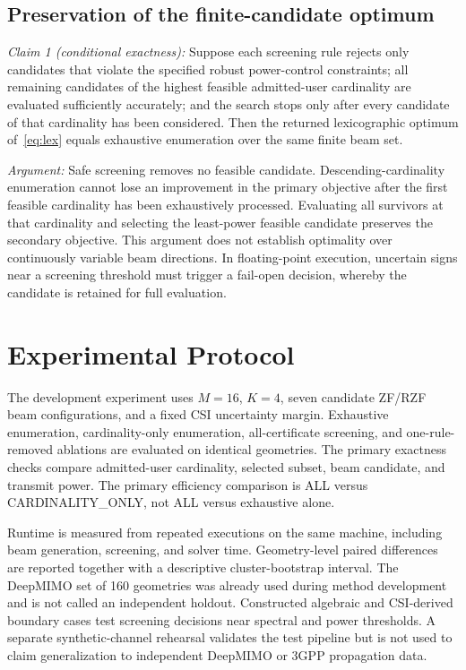\documentclass[journal]{IEEEtran}
\begin{document}
\subsection{Preservation of the finite-candidate optimum}
\emph{Claim 1 (conditional exactness):} Suppose each screening rule rejects only candidates that violate the specified robust power-control constraints; all remaining candidates of the highest feasible admitted-user cardinality are evaluated sufficiently accurately; and the search stops only after every candidate of that cardinality has been considered. Then the returned lexicographic optimum of~\eqref{eq:lex} equals exhaustive enumeration over the same finite beam set.

\emph{Argument:} Safe screening removes no feasible candidate. Descending-cardinality enumeration cannot lose an improvement in the primary objective after the first feasible cardinality has been exhaustively processed. Evaluating all survivors at that cardinality and selecting the least-power feasible candidate preserves the secondary objective. This argument does not establish optimality over continuously variable beam directions. In floating-point execution, uncertain signs near a screening threshold must trigger a fail-open decision, whereby the candidate is retained for full evaluation.

\section{Experimental Protocol}
The development experiment uses $M=16$, $K=4$, seven candidate ZF/RZF beam configurations, and a fixed CSI uncertainty margin. Exhaustive enumeration, cardinality-only enumeration, all-certificate screening, and one-rule-removed ablations are evaluated on identical geometries. The primary exactness checks compare admitted-user cardinality, selected subset, beam candidate, and transmit power. The primary efficiency comparison is ALL versus CARDINALITY\_ONLY, not ALL versus exhaustive alone.

Runtime is measured from repeated executions on the same machine, including beam generation, screening, and solver time. Geometry-level paired differences are reported together with a descriptive cluster-bootstrap interval. The DeepMIMO set of 160 geometries was already used during method development and is not called an independent holdout. Constructed algebraic and CSI-derived boundary cases test screening decisions near spectral and power thresholds. A separate synthetic-channel rehearsal validates the test pipeline but is not used to claim generalization to independent DeepMIMO or 3GPP propagation data.
\end{document}
